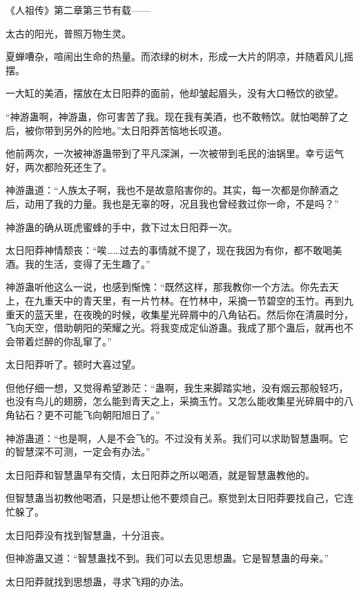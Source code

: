 
\begin{this_body}



《人祖传》第二章第三节有载——

太古的阳光，普照万物生灵。

夏蝉嘈杂，喧闹出生命的热量。而浓绿的树木，形成一大片的阴凉，并随着风儿摇摆。

一大缸的美酒，摆放在太日阳莽的面前，他却皱起眉头，没有大口畅饮的欲望。

“神游蛊啊，神游蛊，你可害苦了我。现在我有美酒，也不敢畅饮。就怕喝醉了之后，被你带到另外的险地。”太日阳莽苦恼地长叹道。

他前两次，一次被神游蛊带到了平凡深渊，一次被带到毛民的油锅里。幸亏运气好，两次都险死还生了。

神游蛊道：“人族太子啊，我也不是故意陷害你的。其实，每一次都是你醉酒之后，动用了我的力量。我也是无辜的呀，况且我也曾经救过你一命，不是吗？”

神游蛊的确从斑虎蜜蜂的手中，救下过太日阳莽一次。

太日阳莽神情颓丧：“唉……过去的事情就不提了，现在我因为有你，都不敢喝美酒。我的生活，变得了无生趣了。”

神游蛊听他这么一说，也感到惭愧：“既然这样，那我教你一个方法。你先去天上，在九重天中的青天里，有一片竹林。在竹林中，采摘一节碧空的玉竹。再到九重天的蓝天里，在夜晚的时候，收集星光碎屑中的八角钻石。然后你在清晨时分，飞向天空，借助朝阳的荣耀之光。将我变成定仙游蛊。我成了那个蛊后，就再也不会带着烂醉的你乱窜了。”

太日阳莽听了。顿时大喜过望。

但他仔细一想，又觉得希望渺茫：“蛊啊，我生来脚踏实地，没有烟云那般轻巧，也没有鸟儿的翅膀，怎么能到青天之上，采摘玉竹。又怎么能收集星光碎屑中的八角钻石？更不可能飞向朝阳旭日了。”

神游蛊道：“也是啊，人是不会飞的。不过没有关系。我们可以求助智慧蛊啊。它的智慧深不可测，一定会有办法。”

太日阳莽和智慧蛊早有交情，太日阳莽之所以喝酒，就是智慧蛊教他的。

但智慧蛊当初教他喝酒，只是想让他不要烦自己。察觉到太日阳莽要找自己，它连忙躲了。

太日阳莽没有找到智慧蛊，十分沮丧。

但神游蛊又道：“智慧蛊找不到。我们可以去见思想蛊。它是智慧蛊的母亲。”

太日阳莽就找到思想蛊，寻求飞翔的办法。


\end{this_body}
